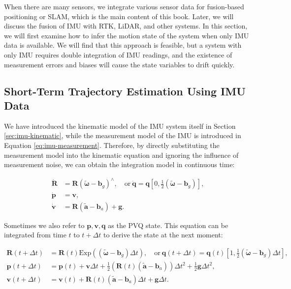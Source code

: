When there are many sensors, we integrate various sensor data for fusion-based positioning or SLAM, which is the main content of this book. Later, we will discuss the fusion of IMU with RTK, LiDAR, and other systems. In this section, we will first examine how to infer the motion state of the system when only IMU data is available. We will find that this approach is feasible, but a system with only IMU requires double integration of IMU readings, and the existence of measurement errors and biases will cause the state variables to drift quickly.

\subsection{Short-Term Trajectory Estimation Using IMU Data}

We have introduced the kinematic model of the IMU system itself in Section \ref{sec:imu-kinematic}, while the measurement model of the IMU is introduced in Equation \eqref{eq:imu-measurement}. Therefore, by directly substituting the measurement model into the kinematic equation and ignoring the influence of measurement noise, we can obtain the integration model in continuous time:

\begin{subequations}\label{key}
	\begin{align}
		\dot{\bm{R}} &= \bm{R} (\tilde{\boldsymbol{\omega}} - \bm{b}_g )^\wedge, \quad \text{or} \ 
		\dot{\bm{q}} = \bm{q} \left[0, \frac{1}{2} \left( \tilde{\boldsymbol{\omega}} -\bm{b}_g\right) 
		\right], \\
		\dot{\bm{p}} &= \bm{v}, \\
		\dot{\bm{v}} &= \bm{R} (\tilde{\bm{a}} - \bm{b}_a) + \bm{g}.
	\end{align}
\end{subequations}

Sometimes we also refer to $\bm{p}, \bm{v}, \bm{q}$ as the PVQ state. This equation can be integrated from time $t$ to $t+\Delta t$ to derive the state at the next moment:

\begin{subequations}\label{eq:3.14}
	\begin{align}
		\bm{R}(t+\Delta t) &= \bm{R}(t) \mathrm{Exp} \left( (\tilde{\boldsymbol{\omega}}-\bm{b}_g) \Delta 
		t \right),\quad \text{or} \ \bm{q}(t+\Delta t) = \bm{q}(t) \left[ 1, \frac{1}{2} \left( 
		\tilde{\boldsymbol{\omega}} - \bm{b}_g\right) \Delta t\right], \\
		\bm{p}(t+\Delta t) &= \bm{p}(t) + \bm{v} \Delta t + \frac{1}{2} \left(\bm{R}(t)(\tilde{\bm{a}}-\bm{b}_a) 
		\right) \Delta t^2 + \frac{1}{2} \bm{g} \Delta t^2, \\
		\bm{v}(t+\Delta t) &= \bm{v}(t) + \bm{R}(t) (\tilde{\bm{a}} - \bm{b}_a) \Delta t + \bm{g} \Delta t	.
	\end{align}
\end{subequations}

